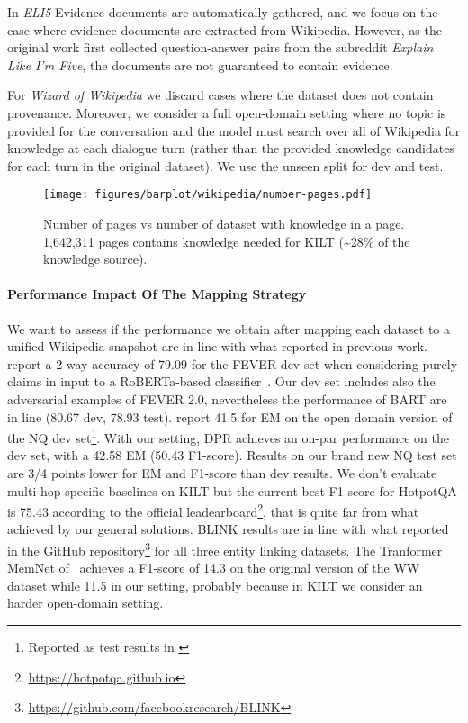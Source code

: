 \documentclass[11pt]{article}
\begin{document}
In \textit{ELI5} Evidence documents are automatically gathered, and we focus on the case where evidence documents are extracted from Wikipedia. However, as the original work first collected question-answer pairs from the subreddit \textit{Explain Like I'm Five}, the documents are not guaranteed to contain evidence. 

For \textit{Wizard of Wikipedia} we discard cases where the dataset does not contain provenance. Moreover, we consider a full open-domain setting where no topic is provided for the conversation and the model must search over all of Wikipedia for knowledge at each dialogue turn (rather than the provided knowledge candidates for each turn in the original dataset). We use the unseen split for dev and test.



\begin{figure}[t!]
    \centering
    \texttt{[image: figures/barplot/wikipedia/number-pages.pdf]}
    \caption{Number of pages vs number of dataset with knowledge in a page. 
    1,642,311 pages contains knowledge needed for KILT (\textasciitilde28\% of the knowledge source). 
    }
    \label{fig:number-pages}
\end{figure}

\paragraph{Performance Impact Of The Mapping Strategy}
We want to assess if the performance we obtain after mapping each dataset to a unified Wikipedia snapshot are in line with what reported in previous work. 
\citet{thorne2020avoiding} report a 2-way accuracy of 79.09 for the FEVER dev set when considering purely claims in input to a RoBERTa-based classifier~\cite{liu2019roberta}. Our dev set includes also the adversarial examples of FEVER 2.0, nevertheless the performance of BART are in line (80.67 dev, 78.93 test).
\citet{karpukhin2020dense} report 41.5 for EM on the open domain version of the NQ dev set\footnote{Reported as test results in \cite{karpukhin2020dense}}. With our setting, DPR achieves an on-par performance on the dev set, with a 42.58 EM (50.43 F1-score). Results on our brand new NQ test set are 3/4 points lower for EM and F1-score than dev results. 
We don't evaluate multi-hop specific baselines on KILT but the current best F1-score for HotpotQA is 75.43 according to the official leadearboard\footnote{\url{https://hotpotqa.github.io}}, that is quite far from what achieved by our general solutions. 
BLINK results are in line with what reported in the GitHub repository\footnote{\url{https://github.com/facebookresearch/BLINK}} for all three entity linking datasets.
The Tranformer MemNet of~\citet{dinan2018wizard} achieves a F1-score of 14.3 on the original version of the WW dataset while 11.5 in our setting, probably because in KILT we consider an harder open-domain setting.
\end{document}
